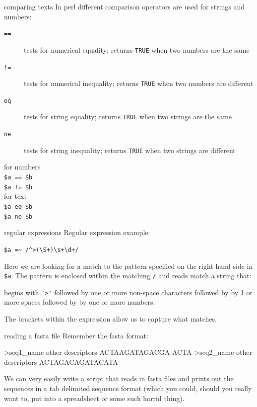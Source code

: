 \documentclass[pdf]{beamer}
\begin{document}
\begin{frame}[fragile]{comparing texts}
  In perl different comparison operators are used for strings and numbers:
  \begin{description}
  \item[\texttt{==}] tests for numerical equality; returns \texttt{TRUE} when
    two numbers are the same
  \item[\texttt{!=}] tests for numerical inequality; returns \texttt{TRUE}
    when two numbers are different
  \item[\texttt{eq}] tests for string equality; returns \texttt{TRUE} when two
    strings are the same
  \item[\texttt{ne}] tests for string inequality; returns \texttt{TRUE} when
    two strings are different
  \end{description}
\vspace{-0.25cm}
for numbers\\
\hspace{2cm} \verb|$a == $b|\\
\hspace{2cm} \verb|$a != $b|\\
for text\\
\hspace{2cm} \verb|$a eq $b|\\
\hspace{2cm} \verb|$a ne $b|

\end{frame}

\begin{frame}[fragile]{regular expressions}
  Regular expression example:

  \verb|$a =~ /^>(\S+)\s+\d+/|

  Here we are looking for a match to the pattern specified on the right hand
  side in \verb|$a|. The pattern is enclosed within the matching \verb|/| and
  reads match a string that:

  begins with \verb|'>'| followed by one or more non-space characters followed by by
  1 or more spaces followed by by one or more numbers.

  The brackets within the expression allow us to capture what matches.

\end{frame}

\begin{frame}[fragile]{reading a fasta file}
  Remember the fasta format:
  \begin{consolecode}
  >seq1_name other descriptors
  ACTAAGATAGACGA
  ACTA
  >seq2_name other descriptors
  ACTAGACAGATACATA
  \end{consolecode}
  
  We can very easily write a script that reads in fasta files and prints out
  the sequences in a tab delimited sequence format (which you could, should
  you really want to, put into a spreadsheet or some such horrid thing).
\end{frame}
\end{document}
